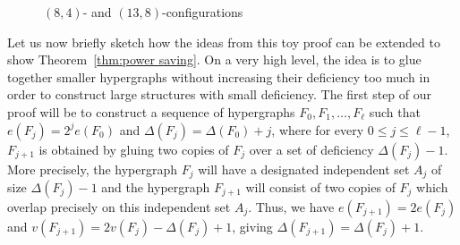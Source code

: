 \documentclass{daj}
\theoremstyle{plain}
\theoremstyle{remark}
\begin{document}
\begin{figure}[t!]
\begin{subfigure}
\end{subfigure}
\caption{$(8, 4)$- and $(13, 8)$-configurations}
\label{fig1}
\end{figure}

Let us now briefly sketch how the ideas from this toy proof can be extended to show Theorem~\ref{thm:power saving}. On a very high level, the idea is to glue together smaller hypergraphs without increasing their deficiency too much in order to construct large structures with small deficiency. The first step of our proof will be to construct a sequence of hypergraphs $F_0, F_1, \dots, F_\ell$ such that $e(F_j)= 2^je(F_0)$ and $\Delta(F_j)=\Delta(F_0)+j$, where for every $0 \le j \le \ell-1$, $F_{j+1}$ is obtained by gluing two copies of $F_j$ over a set of deficiency $\Delta(F_j)-1$. More precisely, the hypergraph $F_j$ will have a designated independent set $A_j$ of size $\Delta(F_j)-1$ and the hypergraph $F_{j+1}$ will consist of two copies of $F_j$ which overlap precisely on this independent set $A_j$. Thus, we have $e(F_{j+1})=2e(F_j)$ and $v(F_{j+1})=2v(F_j)-\Delta(F_j)+1$, giving $\Delta(F_{j+1})=\Delta(F_j)+1$.
\end{document}
